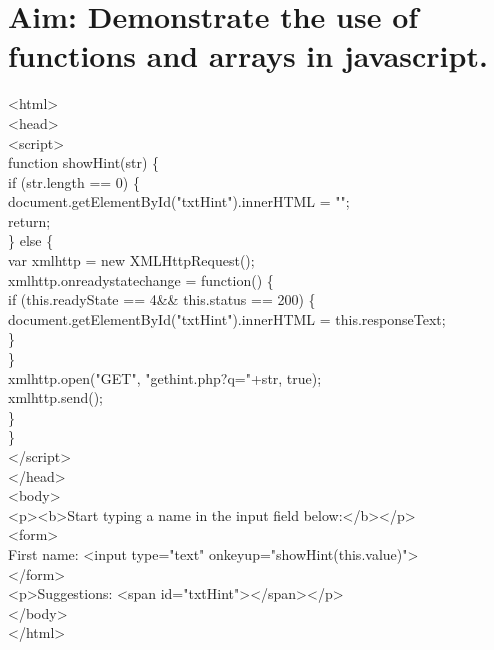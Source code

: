  
\section*{\fontsize{16}{14}\selectfont Aim: Demonstrate the use of functions and arrays in javascript.}
<html>\\
<head>\\
<script>\\
function showHint(str) \{\\
    if (str.length == 0) \{\\
      document.getElementById("txtHint").innerHTML = "";\\
        return;\\
     \} else \{\\ 
      var xmlhttp = new XMLHttpRequest();\\
       xmlhttp.onreadystatechange = function() \{\\
         if (this.readyState == 4\&\& this.status == 200) \{\\
           document.getElementById("txtHint").innerHTML = this.responseText;\\
\}\\
        \}\\
        xmlhttp.open("GET", "gethint.php?q="+str, true);\\
        xmlhttp.send();\\
 \}\\
\}\\
</script>\\
</head>\\
<body>\\

<p><b>Start typing a name in the input field below:</b></p>\\
<form>\\
First name: <input type="text" onkeyup="showHint(this.value)">\\
</form>\\
<p>Suggestions: <span id="txtHint"></span></p>\\
</body>\\
</html>\\
